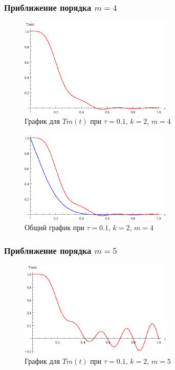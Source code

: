 \newpage

\subsubsection{Приближение порядка $m=4$}

\begin{figure}[h]
\begin{center}
\includegraphics[width=0.65\textwidth]{./3_results/2_8.eps}
\end{center}
\caption{График для $Tm(t)$ при $\tau=0.1$, $k=2$, $m=4$}
\end{figure}

\begin{figure}[h]
\begin{center}
\includegraphics[width=0.65\textwidth]{./3_results/2_9.eps}
\end{center}
\caption{Общий график при $\tau=0.1$, $k=2$, $m=4$}
\end{figure}

\newpage

\subsubsection{Приближение порядка $m=5$}

\begin{figure}[h]
\begin{center}
\includegraphics[width=0.65\textwidth]{./3_results/2_10.eps}
\end{center}
\caption{График для $Tm(t)$ при $\tau=0.1$, $k=2$, $m=5$}
\end{figure}

